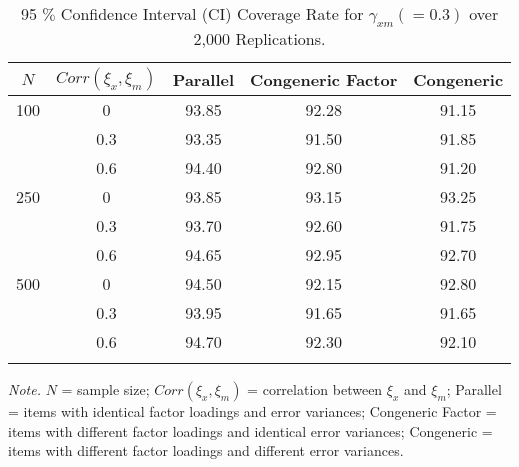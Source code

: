 \documentclass[
  man, donotrepeattitle]{apa6}
\begin{document}
\begin{table}[tbp]

\begin{center}
\begin{threeparttable}

\caption{\label{tab:coverage rate}95 $\%$ Confidence Interval (CI) Coverage Rate for $\gamma_{xm} (= 0.3)$ over 2,000 Replications.}

\begin{tabular}{ccccc}
\toprule
$\textit{N}$ & \multicolumn{1}{c}{$Corr(\xi_{x}, \xi_{m})$} & \multicolumn{1}{c}{Parallel} & \multicolumn{1}{c}{Congeneric Factor} & \multicolumn{1}{c}{Congeneric}\\
\midrule
100 & 0 & 93.85 & 92.28 & 91.15\\
 & 0.3 & 93.35 & 91.50 & 91.85\\
 & 0.6 & 94.40 & 92.80 & 91.20\\
250 & 0 & 93.85 & 93.15 & 93.25\\
 & 0.3 & 93.70 & 92.60 & 91.75\\
 & 0.6 & 94.65 & 92.95 & 92.70\\
500 & 0 & 94.50 & 92.15 & 92.80\\
 & 0.3 & 93.95 & 91.65 & 91.65\\
 & 0.6 & 94.70 & 92.30 & 92.10\\
\bottomrule
\addlinespace
\end{tabular}

\begin{tablenotes}[para]
\normalsize{\textit{Note.} $\textit{N}$ = sample size; $Corr(\xi_{x}, \xi_{m})$ = correlation between $\xi_{x}$ and $\xi_{m}$; Parallel = items with identical factor loadings and error variances; Congeneric Factor = items with different factor loadings and identical error variances; Congeneric = items with different factor loadings and different error variances.}
\end{tablenotes}

\end{threeparttable}
\end{center}

\end{table}
\end{document}
